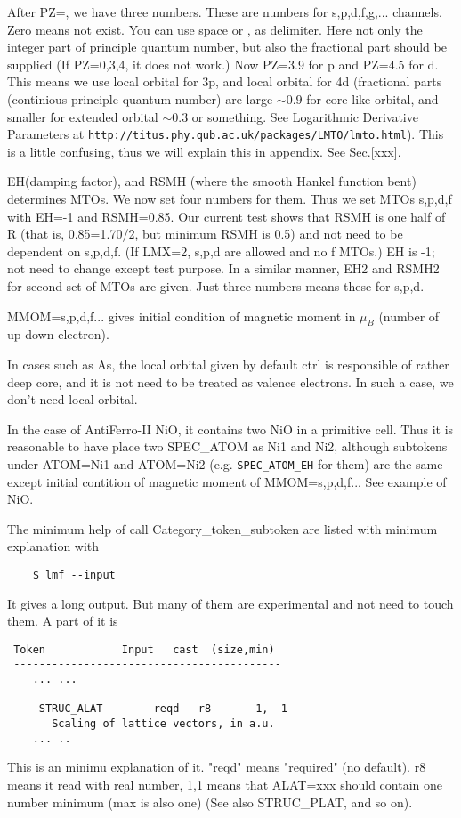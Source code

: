 \documentclass[a4paper,10pt,epsf,fleqn]{article}
\begin{document}
\begin{itemize}
After PZ=, we have three numbers.
These are numbers for s,p,d,f,g,... channels. Zero means not exist.
You can use space or , as delimiter. 
Here not only the integer part of principle quantum number, but also 
the fractional part should be supplied (If PZ=0,3,4, it does not work.)
Now PZ=3.9 for p and PZ=4.5 for d. This means we use local orbital for
3p, and local orbital for 4d (fractional parts (continious principle quantum number) 
are large $\sim 0.9$ for core like orbital, and smaller for extended
orbital $\sim 0.3$ or something. See Logarithmic Derivative Parameters
at \verb+http://titus.phy.qub.ac.uk/packages/LMTO/lmto.html+).
This is a little confusing, thus we will explain this in appendix. See Sec.\ref{xxx}.

EH(damping factor), and RSMH (where the smooth Hankel function bent)
determines MTOs. We now set four numbers for them. Thus we set MTOs
s,p,d,f with EH=-1 and RSMH=0.85. Our current test shows that RSMH is
one half of R (that is, 0.85=1.70/2, but minimum RSMH is 0.5) 
and not need to be dependent on s,p,d,f. (If LMX=2, s,p,d are allowed and no f MTOs.)
EH is -1; not need to change except test purpose.
In a similar manner, EH2 and RSMH2 for second set of MTOs are given.
Just three numbers means these for s,p,d. 

MMOM=s,p,d,f... gives initial condition of magnetic moment in $\mu_B$
(number of up-down electron).

In cases such as As, the local orbital given by default ctrl
is responsible of rather deep core, and it is not need to be treated 
as valence electrons. In such a case,
we don't need local orbital.

In the case of AntiFerro-II NiO, it contains 
two NiO in a primitive cell. Thus it is reasonable to have place two SPEC\_ATOM
as Ni1 and Ni2, although subtokens under
ATOM=Ni1 and ATOM=Ni2 (e.g. \verb+SPEC_ATOM_EH+ for them) are the same
except initial contition of magnetic moment of MMOM=s,p,d,f...
See example of NiO.
\end{itemize}

The minimum help of call Category\_token\_subtoken are listed with
minimum explanation with 
\begin{verbatim}
    $ lmf --input
\end{verbatim}
It gives a long output. But many of them are experimental and not need
to touch them. A part of it is
\begin{verbatim}
 Token            Input   cast  (size,min)
 ------------------------------------------
    ... ...

     STRUC_ALAT        reqd   r8       1,  1
       Scaling of lattice vectors, in a.u.
    ... ..
\end{verbatim}
This is an minimu explanation of it. "reqd" means "required" (no
default). r8 means it read with real number, 1,1 means
that ALAT=xxx should contain one number minimum (max is also one)
(See also STRUC\_PLAT, and so on).
\end{document}
